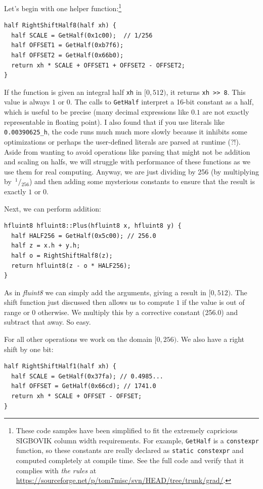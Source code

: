\documentclass[twocolumn]{article}
\newcommand\sfrac[2]{\!{}\,^{#1}\!/{}\!_{#2}}
\begin{document}
Let's begin with one helper function:\footnote{These code samples have
  been simplified to fit the extremely capricious SIGBOVIK column
  width requirements. For example, \verb+GetHalf+ is a
  \verb+constexpr+ function, so these constants are really declared as
  \verb+static constexpr+ and computed completely at compile time. See
  the full code and verify that it complies with {\it the rules} at
  \url{https://sourceforge.net/p/tom7misc/svn/HEAD/tree/trunk/grad/}.}

\begin{lstlisting}
half RightShiftHalf8(half xh) {
  half SCALE = GetHalf(0x1c00);  // 1/256
  half OFFSET1 = GetHalf(0xb7f6);
  half OFFSET2 = GetHalf(0x66b0);
  return xh * SCALE + OFFSET1 + OFFSET2 - OFFSET2;
}
\end{lstlisting}

If the function is given an integral half \verb+xh+ in $[0, 512)$, it
  returns \verb+xh >> 8+. This value is always $1$ or $0$. The calls
  to \verb+GetHalf+ interpret a 16-bit constant as a half, which is
  useful to be precise (many decimal expressions like $0.1$ are not
  exactly representable in floating point). I also found that if
  you use literals like \verb+0.00390625_h+, the code runs much much
  more slowly because it inhibits some optimizations or perhaps
  the user-defined literals are parsed at runtime (?!). Aside
  from wanting to avoid operations like parsing that might not be
  addition and scaling on halfs, we will struggle with performance
  of these functions as we use them for real computing. Anyway,
  we are just dividing by 256 (by multiplying by $\sfrac{1}{256}$)
  and then adding some mysterious constants to ensure that the
  result is exactly $1$ or $0$.

Next, we can perform addition:

\begin{lstlisting}
hfluint8 hfluint8::Plus(hfluint8 x, hfluint8 y) {
  half HALF256 = GetHalf(0x5c00); // 256.0
  half z = x.h + y.h;
  half o = RightShiftHalf8(z);
  return hfluint8(z - o * HALF256);
}
\end{lstlisting}

As in {\it fluint8} we can simply add the arguments, giving a result
in $[0, 512)$. The shift function just discussed then allows us to
  compute $1$ if the value is out of range or $0$ otherwise. We
  multiply this by a corrective constant (256.0) and subtract that
  away. So easy.

For all other operations we work on the domain $[0, 256)$. We also have
a right shift by one bit:
\begin{lstlisting}
half RightShiftHalf1(half xh) {
  half SCALE = GetHalf(0x37fa); // 0.4985...
  half OFFSET = GetHalf(0x66cd); // 1741.0
  return xh * SCALE + OFFSET - OFFSET;
}
\end{lstlisting}
\end{document}
